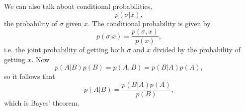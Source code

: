 We can also talk about conditional probabilities,
\begin{equation}
    p(\sigma|x),
\end{equation}
the probability of $\sigma $ given $x$. The conditional probability is given by
\begin{equation}
    p(\sigma|x) = \frac{p(\sigma,x)}{p(x)},
\end{equation}
i.e. the joint probability of getting both $\sigma$ and $x$ divided by the probability of getting $x$. Now
\begin{equation}
    p(A|B)p(B)=p(A,B) =p(B|A)p(A),
\end{equation}
so it follows that
\begin{equation}
    p(A|B)=\frac{p(B|A)p(A)}{p(B)},
\end{equation}
which is Bayes' theorem. 